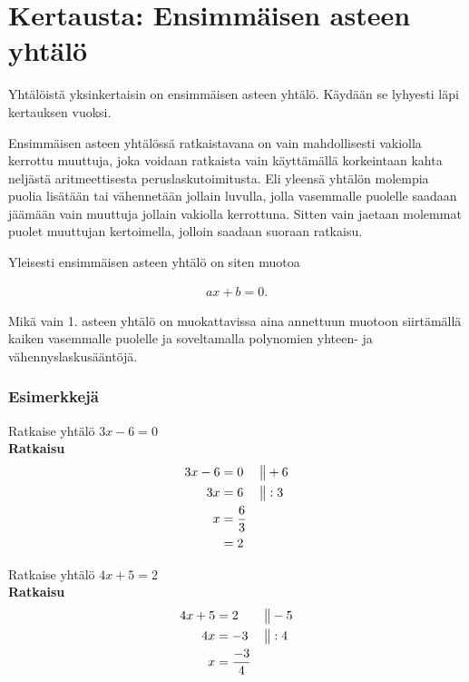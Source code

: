 \section{Kertausta: Ensimmäisen asteen yhtälö}

Yhtälöistä yksinkertaisin on ensimmäisen asteen yhtälö. Käydään se lyhyesti
läpi kertauksen vuoksi.

Ensimmäisen asteen yhtälössä ratkaistavana on vain mahdollisesti vakiolla
kerrottu muuttuja, joka voidaan ratkaista vain käyttämällä korkeintaan
kahta neljästä aritmeettisesta peruslaskutoimitusta. Eli yleensä
yhtälön molempia puolia lisätään tai vähennetään jollain luvulla, jolla
vasemmalle puolelle saadaan jäämään vain muuttuja jollain vakiolla kerrottuna.
Sitten vain jaetaan molemmat puolet muuttujan kertoimella, jolloin saadaan
suoraan ratkaisu.


Yleisesti ensimmäisen asteen yhtälö on siten muotoa

\begin{align*}
    ax + b = 0.
\end{align*}

Mikä vain 1. asteen yhtälö on muokattavissa aina annettuun
muotoon siirtämällä kaiken vasemmalle puolelle ja
soveltamalla polynomien yhteen- ja vähennyslaskusääntöjä.

\subsubsection*{Esimerkkejä}

\begin{esimerkki}
Ratkaise yhtälö $3x - 6 = 0$ \\
\textbf{Ratkaisu} \\
  \begin{align*}
    3x - 6 &= 0 & \big\| & +6 \\
        3x &= 6 & \big\| & :3 \\
         x &= \frac{6}{3} \\
           &= 2
  \end{align*}
\end{esimerkki}

\begin{esimerkki}
Ratkaise yhtälö $4x + 5 = 2$ \\
\textbf{Ratkaisu}
\begin{align*}
    4x + 5 &= 2  & \big\| & -5 \\
        4x &= -3 & \big\| & :4 \\
         x &= \frac{-3}{4}
 \end{align*}
\end{esimerkki}

